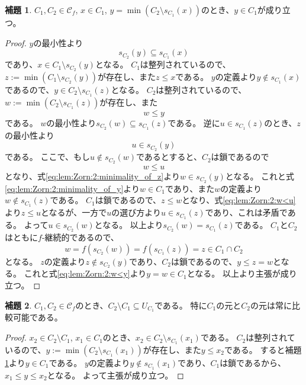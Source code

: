﻿\documentclass{ltjsarticle}
\theoremstyle{definition}
\newtheorem{lemma}{補題}
\begin{document}
\begin{lemma}
    \label{lem:Zorn:2}
    $C_1,C_2 \in \mathcal{C}_f$, $x \in C_1$, $y = \min(C_2 \setminus s_{C_1}(x))$のとき、$y \in C_1$が成り立つ。
\end{lemma}
\begin{proof}
    $y$の最小性より
    \begin{equation}
        \label{eq:lem:Zorn:2:minimality_of_y}
        s_{C_2}(y) \subseteq s_{C_1}(x)
    \end{equation}
    であり、$x \in C_1 \setminus s_{C_2}(y)$となる。
    $C_1$は整列されているので、$z := \min(C_1 \setminus s_{C_2}(y))$が存在し、また$z \leq x$である。
    $y$の定義より$y \not\in s_{C_1}(x)$であるので、$y \in C_2 \setminus s_{C_1}(z)$となる。
    $C_2$は整列されているので、$w := \min(C_2 \setminus s_{C_1}(z))$が存在し、また
    \begin{equation}
        \label{eq:lem:Zorn:2:w<y}
        w \leq y
    \end{equation}
    である。
    $w$の最小性より$s_{C_2}(w) \subseteq s_{C_1}(z)$である。
    逆に$u \in s_{C_1}(z)$のとき、$z$の最小性より
    \begin{equation}
        \label{eq:lem:Zorn:2:minimality_of_z}
        u \in s_{C_2}(y)
    \end{equation}
    である。
    ここで、もし$u \not\in s_{C_2}(w)$であるとすると、$C_2$は鎖であるので
    \begin{equation}
        \label{eq:lem:Zorn:2:w<u}
        w \leq u
    \end{equation}
    となり、式\eqref{eq:lem:Zorn:2:minimality_of_z}より$w \in s_{C_2}(y)$となる。
    これと式\eqref{eq:lem:Zorn:2:minimality_of_y}より$w \in C_1$であり、また$w$の定義より$w \not\in s_{C_1}(z)$である。
    $C_1$は鎖であるので、$z \leq w$となり、式\eqref{eq:lem:Zorn:2:w<u}より$z \leq u$となるが、一方で$u$の選び方より$u \in s_{C_1}(z)$であり、これは矛盾である。
    よって$u \in s_{C_2}(w)$となる。
    以上より$s_{C_2}(w) = s_{C_1}(z)$である。
    $C_1$と$C_2$はともに$f$-継続的であるので、
    \[
        w = f(s_{C_2}(w)) = f(s_{C_1}(z)) = z \in C_1 \cap C_2
    \]
    となる。
    $z$の定義より$z \not\in s_{C_2}(y)$であり、$C_2$は鎖であるので、$y \leq z = w$となる。
    これと式\eqref{eq:lem:Zorn:2:w<y}より$y = w \in C_1$となる。
    以上より主張が成り立つ。
\end{proof}

\begin{lemma}
    \label{lem:Zorn:3}
    $C_1,C_2 \in \mathcal{C}_f$のとき、$C_2 \setminus C_1 \subseteq U_{C_1}$である。
    特に$C_1$の元と$C_2$の元は常に比較可能である。
\end{lemma}
\begin{proof}
    $x_2 \in C_2 \setminus C_1$, $x_1 \in C_1$のとき、$x_2 \in C_2 \setminus s_{C_1}(x_1)$である。
    $C_2$は整列されているので、$y := \min(C_2 \setminus s_{C_1}(x_1))$が存在し、また$y \leq x_2$である。
    すると補題\ref{lem:Zorn:2}より$y \in C_1$である。
    $y$の定義より$y \not\in s_{C_1}(x_1)$であり、$C_1$は鎖であるから、$x_1 \leq y \leq x_2$となる。
    よって主張が成り立つ。
\end{proof}
\end{document}
